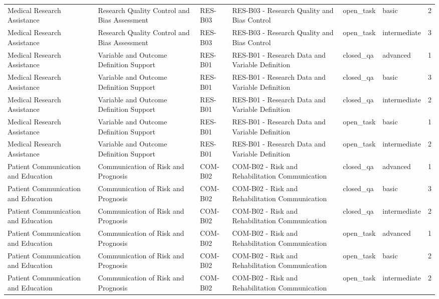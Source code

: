 \begin{tabular}{llllllr}
Medical Research Assistance & Research Quality Control and Bias Assessment & RES-B03 & RES-B03 - Research Quality and Bias Control & open_task & basic & 2 \\
Medical Research Assistance & Research Quality Control and Bias Assessment & RES-B03 & RES-B03 - Research Quality and Bias Control & open_task & intermediate & 3 \\
Medical Research Assistance & Variable and Outcome Definition Support & RES-B01 & RES-B01 - Research Data and Variable Definition & closed_qa & advanced & 1 \\
Medical Research Assistance & Variable and Outcome Definition Support & RES-B01 & RES-B01 - Research Data and Variable Definition & closed_qa & basic & 3 \\
Medical Research Assistance & Variable and Outcome Definition Support & RES-B01 & RES-B01 - Research Data and Variable Definition & closed_qa & intermediate & 2 \\
Medical Research Assistance & Variable and Outcome Definition Support & RES-B01 & RES-B01 - Research Data and Variable Definition & open_task & basic & 1 \\
Medical Research Assistance & Variable and Outcome Definition Support & RES-B01 & RES-B01 - Research Data and Variable Definition & open_task & intermediate & 2 \\
Patient Communication and Education & Communication of Risk and Prognosis & COM-B02 & COM-B02 - Risk and Rehabilitation Communication & closed_qa & advanced & 1 \\
Patient Communication and Education & Communication of Risk and Prognosis & COM-B02 & COM-B02 - Risk and Rehabilitation Communication & closed_qa & basic & 3 \\
Patient Communication and Education & Communication of Risk and Prognosis & COM-B02 & COM-B02 - Risk and Rehabilitation Communication & closed_qa & intermediate & 2 \\
Patient Communication and Education & Communication of Risk and Prognosis & COM-B02 & COM-B02 - Risk and Rehabilitation Communication & open_task & advanced & 1 \\
Patient Communication and Education & Communication of Risk and Prognosis & COM-B02 & COM-B02 - Risk and Rehabilitation Communication & open_task & basic & 2 \\
Patient Communication and Education & Communication of Risk and Prognosis & COM-B02 & COM-B02 - Risk and Rehabilitation Communication & open_task & intermediate & 2 \\

\end{tabular}
